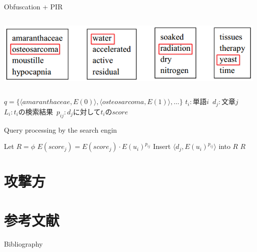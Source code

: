 \documentclass[14pt,xcolor=dvipsnames,table,dvipdfmx]{beamer}
\begin{document}
\begin{frame}{Obfuscation + PIR}
\fontsize{12pt}{7.2}\selectfont
	    \begin{columns}[t]
			\begin{column}{0.8\textwidth} %
				\includegraphics[width=\columnwidth]{photo15-1.png}
			\end{column}
		\end{columns}
    \begin{block}{}
    	$q = \{\langle amaranthaceae,E(0) \rangle , \langle osteosarcoma,E(1) \rangle , \dots \}$ 
    	$t_i:$単語$i\,$ $d_j:$文章$j\,$ $L_i:t_i$の検索結果 $\,p_{ij}:d_j$に対して$t_i$の$score$
    \end{block}
    \begin{block}{Query processing by the search engin}
        \begin{algorithmic}[1]
            \STATE Let $R = \phi$
            \STATE $E(score_j) = E(score_j) \cdot E(u_i)^{p_{ij}}$
            \ELSE \STATE Insert $\langle d_j,E(u_i)^{p_{ij}} \rangle$ into $R$
            \ENDIF
            \ENDFOR
            \ENDFOR
            \RETURN $R$
        \end{algorithmic}
    \end{block}
\end{frame}

\section{攻撃方}
\begin{frame}
\end{frame}
\begin{frame}
\end{frame}
\begin{frame}
\end{frame}

\section{参考文献}
\begin{frame}[t,allowframebreaks]{Bibliography}
\fontsize{8pt}{7.2}\selectfont


\end{frame}
\end{document}
